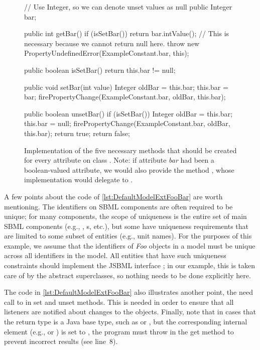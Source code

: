 \begin{figure}[hbt]
  \begin{example}[numbers=left]
// Use Integer, so we can denote unset values as null public Integer bar;

public int getBar() {
  if (isSetBar()) {
    return bar.intValue();
  }
  // This is necessary because we cannot return null here.
  throw new PropertyUndefinedError(ExampleConstant.bar, this);
}

public boolean isSetBar() {
  return this.bar != null;
}

public void setBar(int value) {
  Integer oldBar = this.bar;
  this.bar = bar;
  firePropertyChange(ExampleConstant.bar, oldBar, this.bar);
}

public boolean unsetBar() {
  if (isSetBar()) {
    Integer oldBar = this.bar;
    this.bar = null;
    firePropertyChange(ExampleConstant.bar, oldBar, this.bar);
    return true;
  }
  return false;
}\end{example}
  \caption{Implementation of the five necessary methods that should be
    created for every attribute on class .  Note: if attribute
    \emph{bar} had been a boolean-valued attribute, we would also provide
    the method , whose implementation would delegate to
    .}
  \label{lst:DefaultModelExtFooBar}
\end{figure}

A few points about the code of \vref{lst:DefaultModelExtFooBar} are
worth mentioning.  The identifiers on SBML components are often required to
be unique; for many components, the scope of uniqueness is the entire set
of main SBML components (e.g., \Species, \Compartment{}s, etc.), but some
have uniqueness requirements that are limited to some subset of entities
(e.g., unit names).  For the purposes of this example, we assume that the
identifiers of \emph{Foo} objects in a model must be unique across all
identifiers in the model.  All entities that have such uniqueness
constraints should implement the JSBML interface \UniqueNamedSBase; in our
example, this is taken care of by the abstract superclasses, so nothing
needs to be done explicitly here.

The code in \vref{lst:DefaultModelExtFooBar} also illustrates
another point, the need call to  in set and
unset methods.  This is needed in order to ensure that all listeners are
notified about changes to the objects.  Finally, note that in cases that
the return type is a Java base type, such as  or ,
but the corresponding internal element (e.g.,  or
) is set to , the program must throw 
 in the get method to prevent incorrect
results (see line~8).

